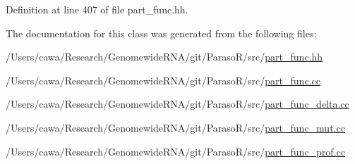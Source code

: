 Definition at line 407 of file part\+\_\+func.\+hh.



The documentation for this class was generated from the following files\+:\begin{DoxyCompactItemize}
\item 
/\+Users/cawa/\+Research/\+Genomewide\+R\+N\+A/git/\+Paraso\+R/src/\hyperlink{part__func_8hh}{part\+\_\+func.\+hh}\item 
/\+Users/cawa/\+Research/\+Genomewide\+R\+N\+A/git/\+Paraso\+R/src/\hyperlink{part__func_8cc}{part\+\_\+func.\+cc}\item 
/\+Users/cawa/\+Research/\+Genomewide\+R\+N\+A/git/\+Paraso\+R/src/\hyperlink{part__func__delta_8cc}{part\+\_\+func\+\_\+delta.\+cc}\item 
/\+Users/cawa/\+Research/\+Genomewide\+R\+N\+A/git/\+Paraso\+R/src/\hyperlink{part__func__mut_8cc}{part\+\_\+func\+\_\+mut.\+cc}\item 
/\+Users/cawa/\+Research/\+Genomewide\+R\+N\+A/git/\+Paraso\+R/src/\hyperlink{part__func__prof_8cc}{part\+\_\+func\+\_\+prof.\+cc}\end{DoxyCompactItemize}
